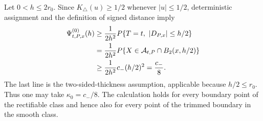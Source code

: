 Let \(0<h\leq2r_0\).  Since \(K_\triangle(u)\geq1/2\) whenever \(|u|\leq1/2\), deterministic assignment and the definition of signed distance imply
\[
\begin{aligned}
 \Psi^{(0)}_{t,P,x}(h)
 &\geq {1\over2h^2}P\{T=t,\ |D_{P,x}|\leq h/2\}\\
 &= {1\over2h^2}P\{X\in\mathcal A_{t,P}\cap B_2(x,h/2)\}\\
 &\geq {1\over2h^2}c_- (h/2)^2={c_-\over8}.
\end{aligned}
\]
The last line is the two-sided-thickness assumption, applicable because \(h/2\leq r_0\).  Thus one may take \(\kappa_0=c_-/8\).  The calculation holds for every boundary point of the rectifiable class and hence also for every point of the trimmed boundary in the smooth class.
